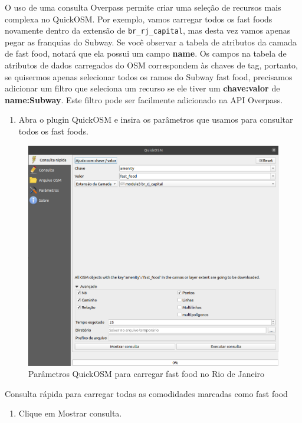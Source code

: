 \documentclass[
]{book}
\providecommand{\tightlist}{%
  \setlength{\itemsep}{0pt}\setlength{\parskip}{0pt}}
\begin{document}
O uso de uma consulta Overpass permite criar uma seleção de recursos mais complexa no QuickOSM. Por exemplo, vamos carregar todos os fast foods novamente dentro da extensão de \texttt{br\_rj\_capital}, mas desta vez vamos apenas pegar as franquias do Subway. Se você observar a tabela de atributos da camada de fast food, notará que ela possui um campo \textbf{name}. Os campos na tabela de atributos de dados carregados do OSM correspondem às chaves de tag, portanto, se quisermos apenas selecionar todos os ramos do Subway fast food, precisamos adicionar um filtro que seleciona um recurso se ele tiver um \textbf{chave:valor} de \textbf{name:Subway}. Este filtro pode ser facilmente adicionado na API Overpass.

\begin{enumerate}
\def\labelenumi{\arabic{enumi}.}
\tightlist
\item
  Abra o plugin QuickOSM e insira os parâmetros que usamos para consultar todos os fast foods.
\end{enumerate}

\begin{figure}
\centering
\includegraphics{media/modulo3/quickosm-6.png}
\caption{Parâmetros QuickOSM para carregar fast food no Rio de Janeiro}
\end{figure}

Consulta rápida para carregar todas as comodidades marcadas como fast food

\begin{enumerate}
\def\labelenumi{\arabic{enumi}.}
\setcounter{enumi}{1}
\tightlist
\item
  Clique em Mostrar consulta.
\end{enumerate}
\end{document}
